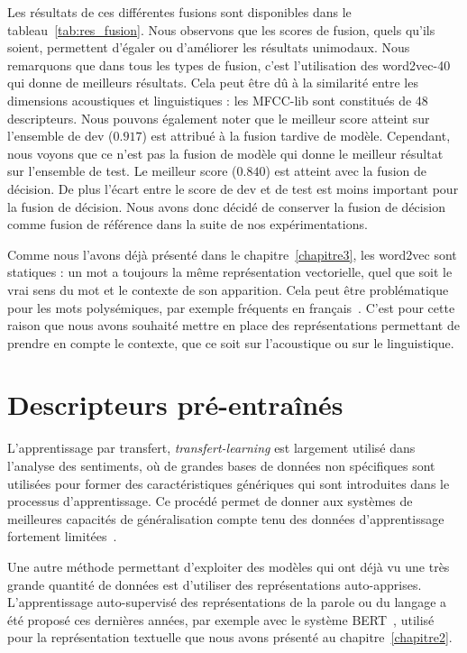 
Les résultats de ces différentes fusions sont disponibles dans le tableau~\ref{tab:res_fusion}. Nous observons que les scores de fusion, quels qu'ils soient, permettent d'égaler ou d'améliorer les résultats unimodaux. Nous remarquons que dans tous les types de fusion, c'est l'utilisation des word2vec-40 qui donne de meilleurs résultats. Cela peut être dû à la similarité entre les dimensions acoustiques et linguistiques : les MFCC-lib sont constitués de 48 descripteurs.
Nous pouvons également noter que le meilleur score atteint sur l'ensemble de dev ($0.917$) est attribué à la fusion tardive de modèle. Cependant, nous voyons que ce n'est pas la fusion de modèle qui donne le meilleur résultat sur l'ensemble de test. Le meilleur score ($0.840$) est atteint avec la fusion de décision. De plus l'écart entre le score de dev et de test est moins important pour la fusion de décision. Nous avons donc décidé de conserver la fusion de décision comme fusion de référence dans la suite de nos expérimentations.

Comme nous l'avons déjà présenté dans le chapitre~\ref{chapitre3}, les word2vec sont statiques : un mot a toujours la même représentation vectorielle, quel que soit le vrai sens du mot et le contexte de son apparition. Cela peut être problématique pour les mots polysémiques, par exemple fréquents en français~\cite{Pustejovsky1996}. C'est pour cette raison que nous avons souhaité mettre en place des représentations permettant de prendre en compte le contexte, que ce soit sur l'acoustique ou sur le linguistique.

\section{Descripteurs pré-entraînés}

L'apprentissage par transfert, \textit{transfert-learning} est largement utilisé dans l'analyse des sentiments, où de grandes bases de données non spécifiques sont utilisées pour former des caractéristiques génériques qui sont introduites dans le processus d’apprentissage.
Ce procédé permet de donner aux systèmes de meilleures capacités de généralisation compte tenu des données d'apprentissage fortement limitées~\cite{Dong2018}.

Une autre méthode permettant d'exploiter des modèles qui ont déjà vu une très grande quantité de données est d'utiliser des représentations auto-apprises. L'apprentissage auto-supervisé des représentations de la parole ou du langage a été proposé ces dernières années, par exemple avec le système BERT~\cite{Devlin2019}, utilisé pour la représentation textuelle que nous avons présenté au chapitre~\ref{chapitre2}.

